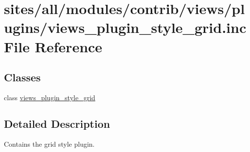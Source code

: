 \hypertarget{views__plugin__style__grid_8inc}{
\section{sites/all/modules/contrib/views/plugins/views\_\-plugin\_\-style\_\-grid.inc File Reference}
\label{views__plugin__style__grid_8inc}
}
\subsection*{Classes}
\begin{CompactItemize}
\item 
class \hyperlink{classviews__plugin__style__grid}{views\_\-plugin\_\-style\_\-grid}
\end{CompactItemize}


\subsection{Detailed Description}
Contains the grid style plugin. 